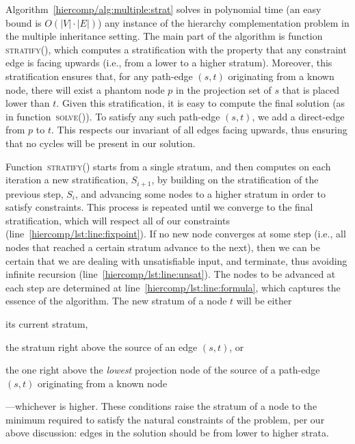 



Algorithm~\ref{hiercomp/alg:multiple:strat} solves in polynomial time (an easy bound is
$O(|V| \cdot |E|)$) any
instance of the hierarchy complementation problem in the multiple
inheritance setting. The main part of the algorithm is
function \textsc{stratify()}, which computes a stratification with the
property that any constraint edge is facing upwards (i.e., from a
lower to a higher stratum). Moreover, this stratification ensures
that, for any path-edge $(s,t)$ originating from a known node, there
will exist a phantom node $p$ in the projection set of $s$ that is
placed lower than $t$. Given this stratification, it is easy to
compute the final solution (as in function~\textsc{solve()}). To
satisfy any such path-edge $(s,t)$, we add a direct-edge from $p$ to
$t$. This respects our invariant of all edges facing upwards, thus
ensuring that no cycles will be present in our solution.

Function~\textsc{stratify()} starts from a single stratum, and then
computes on each iteration a new stratification, $S_{i+1}$, by
building on the stratification of the previous step, $S_{i}$, and
advancing some nodes to a higher stratum in order to satisfy
constraints. This process is repeated until we converge to the final
stratification, which will respect all of our constraints
(line~\ref{hiercomp/lst:line:fixpoint}). If no new node converges at some step
(i.e., all nodes that reached a certain stratum advance to the next),
then we can be certain that we are dealing with unsatisfiable input,
and terminate, thus avoiding infinite recursion
(line~\ref{hiercomp/lst:line:unsat}). The nodes to be advanced at each step are
determined at line~\ref{hiercomp/lst:line:formula}, which captures the essence
of the algorithm. The new stratum of a node $t$ will be either
\begin{inparaenum}[(i)]
\item its current stratum,
\item the stratum right above the source of an edge $(s,t)$, or
\item the one right above the \emph{lowest} projection node of the
  source of a path-edge $(s,t)$ originating from a known node%
\end{inparaenum}%
---whichever is higher.  These conditions raise the stratum of a node
to the minimum required to satisfy the natural constraints of the
problem, per our above discussion: edges in the solution should be
from lower to higher strata.


